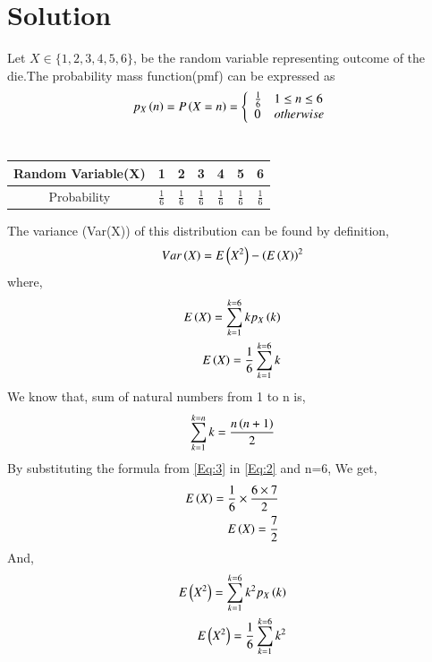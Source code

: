 \documentclass[journal,12pt,twocolumn]{IEEEtran}
\begin{document}
\section{Solution}
Let $X \in \{1,2,3,4,5,6\}$, be the random variable representing outcome of the die.The probability mass function(pmf) can be expressed as
\begin{align}
p_X\left(n\right) = P\left(X=n\right) =    \left\{ 
                  \begin{array}{ll}
                      \frac{1}{6} & 1 \leq n \leq 6 \notag \\
                      0 & otherwise \notag \\
                  \end{array} 
                  \right.    
\end{align}
\\
\begin{center}
\begin{tabular}{ |c|c|c|c|c|c|c| } 
 \hline
 Random Variable(X) & 1 & 2 & 3 & 4 & 5 & 6 \\ 
 \hline
 Probability & $\frac{1}{6}$ & $\frac{1}{6}$ & $\frac{1}{6}$ & $\frac{1}{6}$ & $\frac{1}{6}$ & $\frac{1}{6}$ \\
 \hline
\end{tabular}
\end{center}
The variance (Var(X)) of this distribution can be found by definition,\\
\begin{align}
Var\left(X\right) = E\left(X^{2}\right)-\left(E\left(X\right)\right)^{2} \label{Eq:1}
\end{align}
where,
\begin{align}
E\left(X\right)=\sum_{k=1}^{k=6} kp_X\left(k\right) \notag \\
E\left(X\right)=\frac{1}{6}\sum_{k=1}^{k=6} k \label{Eq:2}
\end{align}
We know that, sum of natural numbers from 1 to n is,
\begin{align}
\sum_{k=1}^{k=n} k = \frac{n\left(n+1\right)}{2} \label{Eq:3}
\end{align}
By substituting the formula from \eqref{Eq:3} in \eqref{Eq:2} and n=6, We get,
\begin{align}
E\left(X\right)=\frac{1}{6} \times \frac{6\times7}{2} \notag \\
E\left(X\right)=\frac{7}{2} \label{Eq:4}
\end{align}
And,
\begin{align}
E\left(X^{2}\right)=\sum_{k=1}^{k=6} k^{2}p_X\left(k\right) \notag \\
E\left(X^{2}\right)=\frac{1}{6}\sum_{k=1}^{k=6} k^{2} \label{Eq:5}
\end{align}
\end{document}
